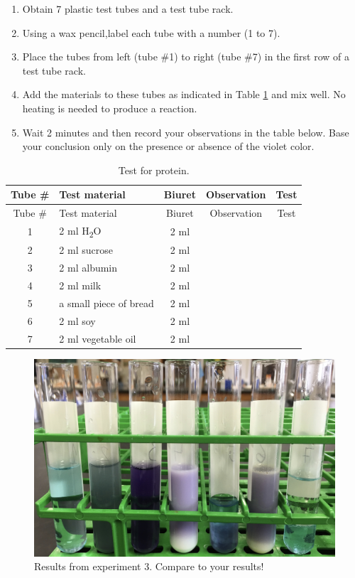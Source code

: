 \begin{enumerate}
\def\labelenumi{\arabic{enumi}.}
\tightlist
\item
  Obtain 7 plastic test tubes and a test tube rack.
\item
  Using a wax pencil,label each tube with a number (1 to 7).
\item
  Place the tubes from left (tube \#1) to right (tube \#7) in the first
  row of a test tube rack.
\item
  Add the materials to these tubes as indicated in Table
  \ref{tab:protein} and mix well. No heating is needed to produce a
  reaction.
\item
  Wait 2 minutes and then record your observations in the table below.
  Base your conclusion only on the presence or absence of the violet
  color.
\end{enumerate}

\begin{longtable}[]{@{}clccc@{}}
\caption{\label{tab:protein} Test for protein.}\tabularnewline
\toprule
Tube \# & Test material & Biuret & Observation & Test\tabularnewline
\midrule
\endfirsthead
\toprule
Tube \# & Test material & Biuret & Observation & Test\tabularnewline
\midrule
\endhead
1 & 2 ml H\textsubscript{2}O & 2 ml & &\tabularnewline
2 & 2 ml sucrose & 2 ml & &\tabularnewline
3 & 2 ml albumin & 2 ml & &\tabularnewline
4 & 2 ml milk & 2 ml & &\tabularnewline
5 & a small piece of bread & 2 ml & &\tabularnewline
6 & 2 ml soy & 2 ml & &\tabularnewline
7 & 2 ml vegetable oil & 2 ml & &\tabularnewline
\bottomrule
\end{longtable}

\begin{figure}

{\centering \includegraphics[width=0.7\linewidth]{./figures/chem_aspects/Results_exp_3} 

}

\caption{Results from experiment 3. Compare to your results!}\label{fig:exp3}
\end{figure}

